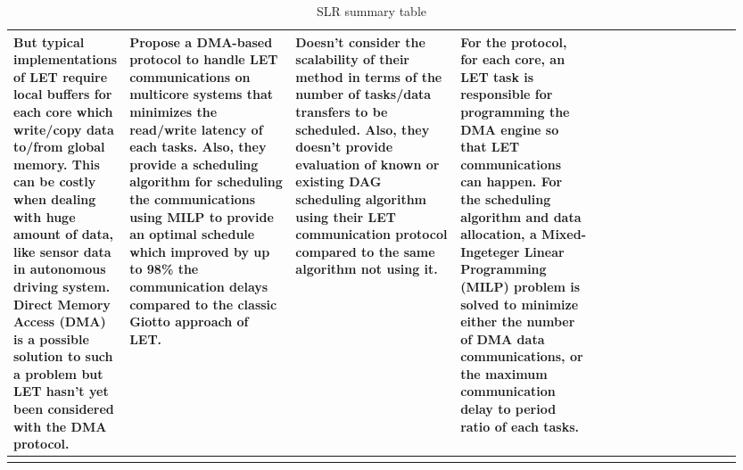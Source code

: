 \documentclass{article}
\begin{document}
\begin{longtable}{|l|p{0.25\linewidth}|p{0.25\linewidth}|p{0.20\linewidth}|p{0.25\linewidth}|}
        But typical implementations of LET 
        require local buffers for each core which write/copy data to/from
        global memory. This can be costly when dealing 
        with huge amount of data, like sensor data in autonomous driving system.
        Direct Memory Access (DMA) is a possible solution to such a problem
        but LET hasn't yet been considered with the DMA protocol. &
        Propose a DMA-based protocol to handle LET communications
        on multicore systems that minimizes the read/write latency of each tasks.
        Also, they provide a scheduling algorithm for scheduling the communications
        using MILP to provide an optimal schedule
        which improved by up to 98\% the communication delays compared
        to the classic Giotto approach of LET. & Doesn't consider 
        the scalability of their method in terms of the number of tasks/data transfers to be scheduled. 
        Also, they doesn't provide
        evaluation of known or existing DAG scheduling algorithm
        using their LET communication protocol compared to the same algorithm not using it.
        & For the protocol, for each core, an LET task is responsible for 
        programming the DMA engine so that LET communications can happen.
        For the scheduling algorithm and data allocation,
        a Mixed-Ingeteger Linear Programming (MILP) problem 
        is solved to minimize either the number of DMA data communications,
        or the maximum communication delay to period ratio of each tasks.  \\
        \hline
    \caption{SLR summary table}
    \label{tab:slt_sum_table}
\end{longtable}


\printbibliography
\end{document}

